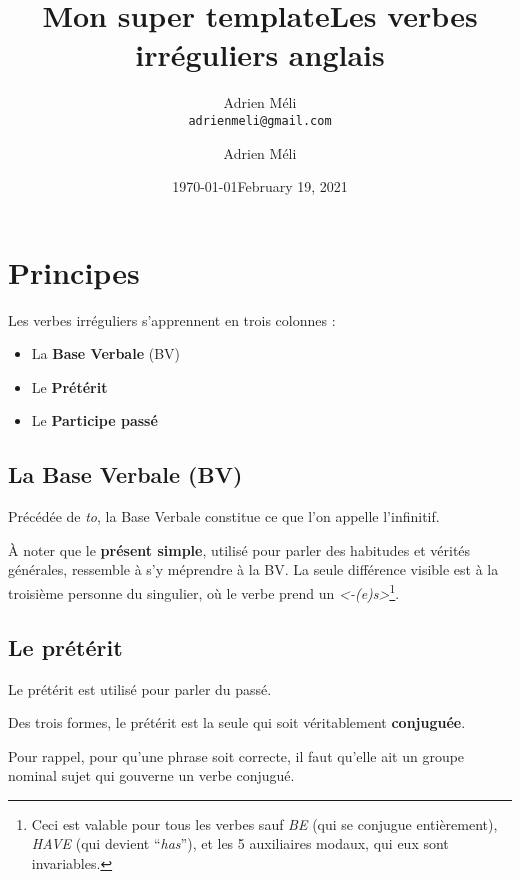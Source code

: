 \documentclass[
  10pt,
]{article}
\title{Mon super template}
\author{Adrien M\'{e}li\\{\tt adrienmeli@gmail.com}}
\date{\today}
\title{Les verbes irréguliers anglais}
\author{Adrien Méli}
\date{February 19, 2021}
\begin{document}
\maketitle


\hypertarget{principes}{%
\section{Principes}\label{principes}}

Les verbes irréguliers s'apprennent en trois colonnes :

\begin{itemize}
\item
  La \textbf{Base Verbale} (BV)
\item
  Le \textbf{Prétérit}
\item
  Le \textbf{Participe passé}
\end{itemize}

\hypertarget{la-base-verbale-bv}{%
\subsection{La Base Verbale (BV)}\label{la-base-verbale-bv}}

Précédée de \emph{to}, la Base Verbale constitue ce que l'on appelle l'infinitif.

À noter que le \textbf{présent simple}, utilisé pour parler des habitudes et vérités générales, ressemble à s'y méprendre à la BV.
La seule différence visible est à la troisième personne du singulier, où le verbe prend un \emph{\textless-(e)s\textgreater{}}\footnote{Ceci est valable pour tous les verbes sauf \emph{BE} (qui se conjugue entièrement), \emph{HAVE} (qui devient ``\emph{has}''), et les 5 auxiliaires modaux, qui eux sont invariables.}.

\hypertarget{le-pruxe9tuxe9rit}{%
\subsection{Le prétérit}\label{le-pruxe9tuxe9rit}}

Le prétérit est utilisé pour parler du passé.

Des trois formes, le prétérit est la seule qui soit véritablement \textbf{conjuguée}.

Pour rappel, pour qu'une phrase soit correcte, il faut qu'elle ait un groupe nominal sujet qui gouverne un verbe conjugué.
\end{document}
